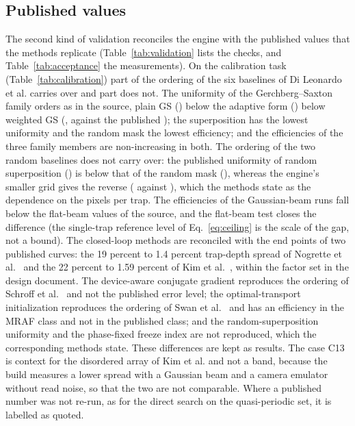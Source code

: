 \subsection{Published values}\label{sec:validation-published}

The second kind of validation reconciles the engine with the published values that the methods replicate (Table~\ref{tab:validation} lists the checks, and Table~\ref{tab:acceptance} the measurements). On the calibration task (Table~\ref{tab:calibration}) part of the ordering of the six baselines of Di Leonardo et al. carries over and part does not. The uniformity of the Gerchberg--Saxton family orders as in the source, plain GS (\calUFour) below the adaptive form (\calUFive) below weighted GS (\calUSix, against the published \pubUSix); the superposition has the lowest uniformity and the random mask the lowest efficiency; and the efficiencies of the three family members are non-increasing in both. The ordering of the two random baselines does not carry over: the published uniformity of random superposition (\pubUTwo) is below that of the random mask (\pubUThree), whereas the engine's smaller grid gives the reverse (\calUTwo{} against \calUThree), which the methods state as the dependence on the pixels per trap. The efficiencies of the Gaussian-beam runs fall below the flat-beam values of the source, and the flat-beam test closes the difference (the single-trap reference level of Eq.~\eqref{eq:ceiling} is the scale of the gap, not a bound). The closed-loop methods are reconciled with the end points of two published curves: the 19 percent to 1.4 percent trap-depth spread of Nogrette et al.~\cite{nogrette} and the 22 percent to 1.59 percent of Kim et al.~\cite{kim2019}, within the factor set in the design document. The device-aware conjugate gradient reproduces the ordering of Schroff et al.~\cite{schroff} and not the published error level; the optimal-transport initialization reproduces the ordering of Swan et al.~\cite{swan} and has an efficiency in the MRAF class and not in the published class; and the random-superposition uniformity and the phase-fixed freeze index are not reproduced, which the corresponding methods state. These differences are kept as results. The case C13 is context for the disordered array of Kim et al. and not a band, because the build measures a lower spread with a Gaussian beam and a camera emulator without read noise, so that the two are not comparable. Where a published number was not re-run, as for the direct search on the quasi-periodic set, it is labelled as quoted.

